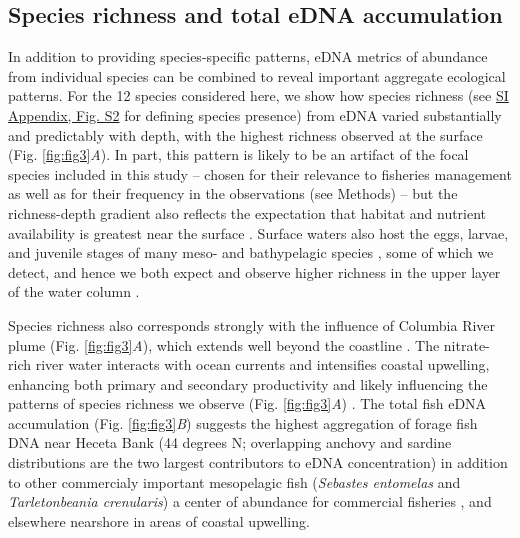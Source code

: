 \documentclass[9pt,twocolumn,twoside]{pnas-new}
\begin{document}
\subsection*{Species richness and total eDNA accumulation}
In addition to providing species-specific patterns, eDNA metrics of abundance from individual species can be combined to reveal important aggregate ecological patterns. For the 12 species considered here, we show how species richness (see \href{SI_Appendix.pdf}{SI Appendix, Fig. S2} for defining species presence) from eDNA varied substantially and predictably with depth, with the highest richness observed at the surface (Fig. \ref{fig:fig3}\textit{A}). In part, this pattern is likely to be an artifact of the focal species included in this study -- chosen for their relevance to fisheries management as well as for their frequency in the observations (see Methods) -- but the richness-depth gradient also reflects the expectation that habitat and nutrient availability is greatest near the surface \cite{smith2002,hickey2005}. Surface waters also host the eggs, larvae, and juvenile stages of many meso- and bathypelagic species \cite{parnel2008}, some of which we detect, and hence we both expect and observe higher richness in the upper layer of the water column \cite{kim2011}.

Species richness also corresponds strongly with the influence of Columbia River plume (Fig. \ref{fig:fig3}\textit{A}), which extends well beyond the coastline \cite{hickey2003}. The nitrate-rich river water interacts with ocean currents and intensifies coastal upwelling, enhancing both primary and secondary productivity \cite{hickey2010} and likely influencing the patterns of species richness we observe (Fig. \ref{fig:fig3}\textit{A}) \cite{tolimieri2015}. The total fish eDNA accumulation (Fig. \ref{fig:fig3}\textit{B}) suggests the highest aggregation of forage fish DNA near Heceta Bank (44 degrees N; overlapping anchovy and sardine distributions are the two largest contributors to eDNA concentration) in addition to other commercialy important mesopelagic fish (\textit{Sebastes entomelas} and \textit{Tarletonbeania crenularis}) a center of abundance for commercial fisheries \cite{bosley2014,Tissot2008TwentyYO}, and elsewhere nearshore in areas of coastal upwelling.
\end{document}
